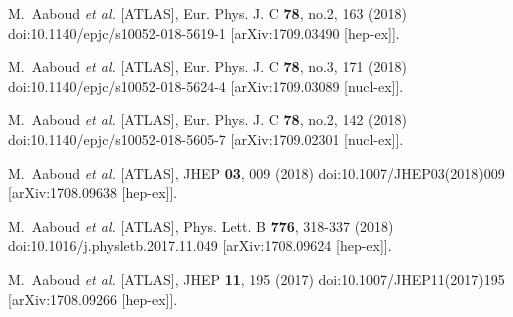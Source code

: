 \begin{thebibliography}{9}
M.~Aaboud \textit{et al.} [ATLAS],
Eur. Phys. J. C \textbf{78}, no.2, 163 (2018)
doi:10.1140/epjc/s10052-018-5619-1
[arXiv:1709.03490 [hep-ex]].

M.~Aaboud \textit{et al.} [ATLAS],
Eur. Phys. J. C \textbf{78}, no.3, 171 (2018)
doi:10.1140/epjc/s10052-018-5624-4
[arXiv:1709.03089 [nucl-ex]].

M.~Aaboud \textit{et al.} [ATLAS],
Eur. Phys. J. C \textbf{78}, no.2, 142 (2018)
doi:10.1140/epjc/s10052-018-5605-7
[arXiv:1709.02301 [nucl-ex]].

M.~Aaboud \textit{et al.} [ATLAS],
JHEP \textbf{03}, 009 (2018)
doi:10.1007/JHEP03(2018)009
[arXiv:1708.09638 [hep-ex]].

M.~Aaboud \textit{et al.} [ATLAS],
Phys. Lett. B \textbf{776}, 318-337 (2018)
doi:10.1016/j.physletb.2017.11.049
[arXiv:1708.09624 [hep-ex]].

M.~Aaboud \textit{et al.} [ATLAS],
JHEP \textbf{11}, 195 (2017)
doi:10.1007/JHEP11(2017)195
[arXiv:1708.09266 [hep-ex]].


\end{thebibliography}
